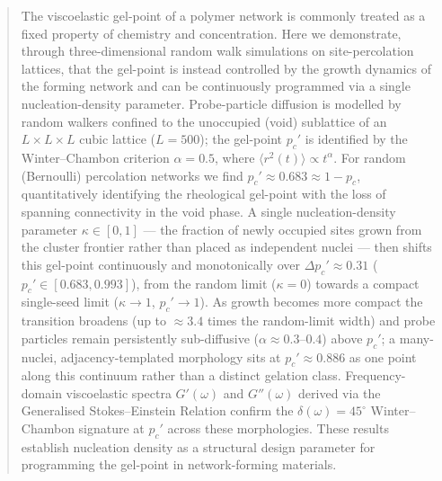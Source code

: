 \begin{abstract}
The viscoelastic gel-point of a polymer network is commonly treated as a fixed property of chemistry and concentration. Here we demonstrate, through three-dimensional random walk simulations on site-percolation lattices, that the gel-point is instead controlled by the growth dynamics of the forming network and can be continuously programmed via a single nucleation-density parameter. Probe-particle diffusion is modelled by random walkers confined to the unoccupied (void) sublattice of an $L \times L \times L$ cubic lattice ($L = 500$); the gel-point $p_c'$ is identified by the Winter--Chambon criterion $\alpha = 0.5$, where $\langle r^2(t) \rangle \propto t^\alpha$. For random (Bernoulli) percolation networks we find $p_c' \approx 0.683 \approx 1 - p_c$, quantitatively identifying the rheological gel-point with the loss of spanning connectivity in the void phase. A single nucleation-density parameter $\kappa \in [0,1]$ — the fraction of newly occupied sites grown from the cluster frontier rather than placed as independent nuclei — then shifts this gel-point continuously and monotonically over $\Delta p_c' \approx 0.31$ ($p_c' \in [0.683, 0.993]$), from the random limit ($\kappa = 0$) towards a compact single-seed limit ($\kappa \to 1$, $p_c' \to 1$). As growth becomes more compact the transition broadens (up to $\approx 3.4$ times the random-limit width) and probe particles remain persistently sub-diffusive ($\alpha \approx 0.3$--$0.4$) above $p_c'$; a many-nuclei, adjacency-templated morphology sits at $p_c' \approx 0.886$ as one point along this continuum rather than a distinct gelation class. Frequency-domain viscoelastic spectra $G'(\omega)$ and $G''(\omega)$ derived via the Generalised Stokes--Einstein Relation confirm the $\delta(\omega) = 45^{\circ}$ Winter--Chambon signature at $p_c'$ across these morphologies. These results establish nucleation density as a structural design parameter for programming the gel-point in network-forming materials.
\end{abstract}
